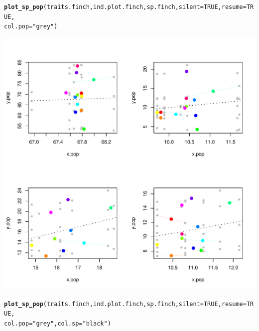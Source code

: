 \documentclass[12pt]{article}\usepackage[]{graphicx}\usepackage[]{color}
\makeatletter
\def\maxwidth{ %
  \ifdim\Gin@nat@width>\linewidth
    \linewidth
  \else
    \Gin@nat@width
  \fi
}
\newcommand{\hlnum}[1]{\textcolor[rgb]{0.686,0.059,0.569}{#1}}%
\newcommand{\hlstr}[1]{\textcolor[rgb]{0.192,0.494,0.8}{#1}}%
\newcommand{\hlstd}[1]{\textcolor[rgb]{0.345,0.345,0.345}{#1}}%
\newcommand{\hlkwc}[1]{\textcolor[rgb]{0.333,0.667,0.333}{#1}}%
\newcommand{\hlkwd}[1]{\textcolor[rgb]{0.737,0.353,0.396}{\textbf{#1}}}%
\newenvironment{kframe}{%
 \def\at@end@of@kframe{}%
 \ifinner\ifhmode%
  \def\at@end@of@kframe{\end{minipage}}%
  \begin{minipage}{\columnwidth}%
 \fi\fi%
 \def\FrameCommand##1{\hskip\@totalleftmargin \hskip-\fboxsep
 \colorbox{shadecolor}{##1}\hskip-\fboxsep
     \hskip-\linewidth \hskip-\@totalleftmargin \hskip\columnwidth}%
 \MakeFramed {\advance\hsize-\width
   \@totalleftmargin\z@ \linewidth\hsize
   \@setminipage}}%
 {\par\unskip\endMakeFramed%
 \at@end@of@kframe}
\newenvironment{knitrout}{}{} %
\makeatother
\begin{document}
\begin{knitrout}
\color{fgcolor}\begin{kframe}
\begin{alltt}
\hlkwd{plot_sp_pop}\hlstd{(traits.finch, ind.plot.finch, sp.finch,} \hlkwc{silent} \hlstd{=} \hlnum{TRUE}\hlstd{,} \hlkwc{resume} \hlstd{=} \hlnum{TRUE}\hlstd{,}
    \hlkwc{col.pop} \hlstd{=} \hlstr{"grey"}\hlstd{)}
\end{alltt}
\end{kframe}
\includegraphics[width=\maxwidth]{figure/unnamed-chunk-191} 
\begin{kframe}\begin{alltt}
\hlkwd{plot_sp_pop}\hlstd{(traits.finch, ind.plot.finch, sp.finch,} \hlkwc{silent} \hlstd{=} \hlnum{TRUE}\hlstd{,} \hlkwc{resume} \hlstd{=} \hlnum{TRUE}\hlstd{,}
    \hlkwc{col.pop} \hlstd{=} \hlstr{"grey"}\hlstd{,} \hlkwc{col.sp} \hlstd{=} \hlstr{"black"}\hlstd{)}
\end{alltt}
\end{kframe}

\end{knitrout}
\end{document}
